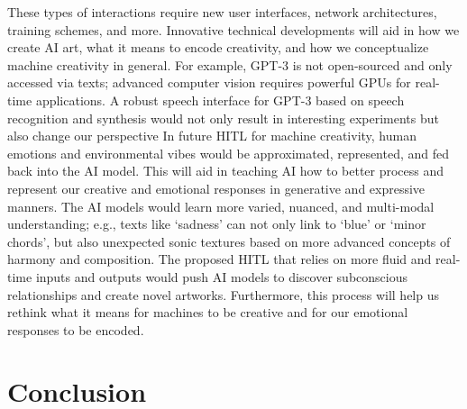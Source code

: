 \documentclass[letterpaper]{article} %
\begin{document}
These types of interactions require new user interfaces, network architectures, training schemes, and more. Innovative technical developments will aid in how we create AI art, what it means to encode creativity, and how we conceptualize machine creativity in general. For example, GPT-3 is not open-sourced and only accessed via texts; advanced computer vision requires powerful GPUs for real-time applications. A robust speech interface for GPT-3 based on speech recognition and synthesis would not only result in interesting experiments but also change our perspective  In future HITL for machine creativity, human emotions and environmental vibes would be approximated, represented, and fed back into the AI model. This will aid in teaching AI how to better process and represent our creative and emotional responses in generative and expressive manners. The AI models would learn more varied, nuanced, and multi-modal understanding; e.g., texts like `sadness' can not only link to `blue' or `minor chords', but also unexpected sonic textures based on more advanced concepts of harmony and composition. The proposed HITL that relies on more fluid and real-time inputs and outputs would push AI models to discover subconscious relationships and create novel artworks. Furthermore, this process will help us rethink what it means for machines to be creative and for our emotional responses to be encoded.

\vspace{-0.75mm}
\section{Conclusion}
\label{conclusion}
\end{document}
